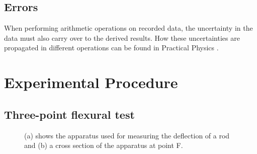 \documentclass[11pt,a4paper]{article}
\begin{document}
  \subsection{Errors}
    When performing arithmetic operations on recorded data, the uncertainty in the data must also carry over to the derived results. How these uncertainties are propagated in different operations can be found in Practical Physics \cite{squires}.


\section{\label{section:experimental}Experimental Procedure}
  \subsection{Three-point flexural test}

    \begin{figure}[H]
      \centering
      \center
      \caption{(a) shows the apparatus used for measuring the deflection of a rod and (b) a cross section of the  apparatus at point F.}
      \label{fig:exp_1}
     \end{figure}
\end{document}
